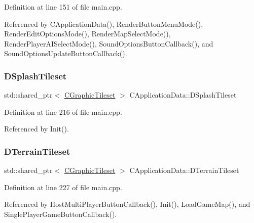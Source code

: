 Definition at line 151 of file main.\+cpp.



Referenced by C\+Application\+Data(), Render\+Button\+Menu\+Mode(), Render\+Edit\+Options\+Mode(), Render\+Map\+Select\+Mode(), Render\+Player\+A\+I\+Select\+Mode(), Sound\+Options\+Button\+Callback(), and Sound\+Options\+Update\+Button\+Callback().

\hypertarget{classCApplicationData_aea23915b726e1a5aa68a309109679ae1}{}\label{classCApplicationData_aea23915b726e1a5aa68a309109679ae1} 
\subsubsection{\texorpdfstring{D\+Splash\+Tileset}{DSplashTileset}}
{\footnotesize\ttfamily std\+::shared\+\_\+ptr$<$ \hyperlink{classCGraphicTileset}{C\+Graphic\+Tileset} $>$ C\+Application\+Data\+::\+D\+Splash\+Tileset\hspace{0.3cm}{\ttfamily [protected]}}



Definition at line 216 of file main.\+cpp.



Referenced by Init().

\hypertarget{classCApplicationData_acd9fb0d0ea35a6d93e8ec9212db8ef83}{}\label{classCApplicationData_acd9fb0d0ea35a6d93e8ec9212db8ef83} 
\subsubsection{\texorpdfstring{D\+Terrain\+Tileset}{DTerrainTileset}}
{\footnotesize\ttfamily std\+::shared\+\_\+ptr$<$ \hyperlink{classCGraphicTileset}{C\+Graphic\+Tileset} $>$ C\+Application\+Data\+::\+D\+Terrain\+Tileset\hspace{0.3cm}{\ttfamily [protected]}}



Definition at line 227 of file main.\+cpp.



Referenced by Host\+Multi\+Player\+Button\+Callback(), Init(), Load\+Game\+Map(), and Single\+Player\+Game\+Button\+Callback().

